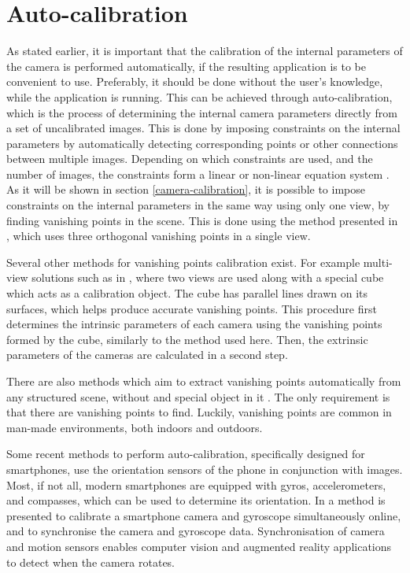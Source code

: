 \section{Auto-calibration} \label{related_work:vanishing_point_calibration} 
As stated earlier, it is important that the calibration of the internal parameters of the camera is performed automatically, if the resulting application is to be convenient to use.
Preferably, it should be done without the user's knowledge, while the application is running.
This can be achieved through auto-calibration, which is the process of determining the internal camera parameters directly from a set of uncalibrated images.
This is done by imposing constraints on the internal parameters by automatically detecting corresponding points or other connections between multiple images. 
Depending on which constraints are used, and the number of images, the constraints form a linear or non-linear equation system \cite[p. 458-469]{hartley-zisserman}. 
As it will be shown in section \ref{camera-calibration}, it is possible to impose constraints on the internal parameters in the same way using only one view, by finding vanishing points in the scene.
This is done using the method presented in \cite[p. 195-226]{hartley-zisserman}, which uses three orthogonal vanishing points in a single view.

Several other methods for vanishing points calibration exist.
For example multi-view solutions such as in \cite{caprile1990using}, where two views are used along with a special cube which acts as a calibration object.
The cube has parallel lines drawn on its surfaces, which helps produce accurate vanishing points.
This procedure first determines the intrinsic parameters of each camera using the vanishing points formed by the cube, similarly to the method used here.
Then, the extrinsic parameters of the cameras are calculated in a second step.

There are also methods which aim to extract vanishing points automatically from any structured scene, without and special object in it \cite{cipolla1999camera} \cite{grammatikopoulos2007automatic}.
The only requirement is that there are vanishing points to find.
Luckily, vanishing points are common in man-made environments, both indoors and outdoors.

Some recent methods to perform auto-calibration, specifically designed for smartphones, use the orientation sensors of the phone in conjunction with images.
Most, if not all, modern  smartphones are equipped with gyros, accelerometers, and compasses, which can be used to determine its orientation.
In \cite{jia2014online} a method is presented to calibrate a smartphone camera and gyroscope simultaneously online, and to synchronise the camera and gyroscope data.
Synchronisation of camera and motion sensors enables computer vision and augmented reality applications to detect when the camera rotates.

